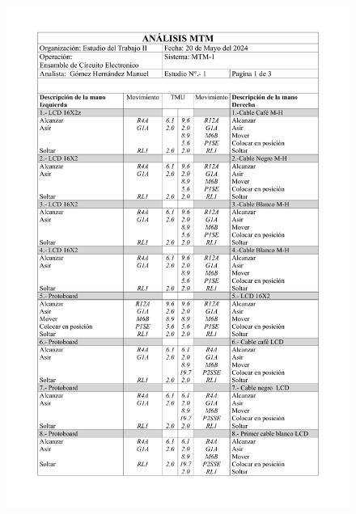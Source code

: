     \begin{figure}[H]
        \centering
        \includegraphics[scale=0.165]{15/img/tablaMTM1-1.pdf}

\end{figure}
